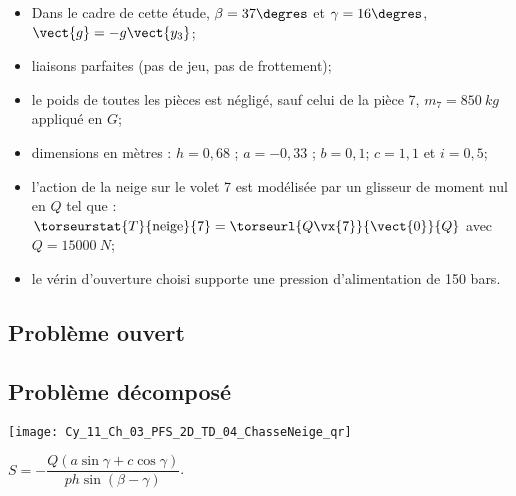 \begin{itemize}
\item Dans le cadre de cette étude, $\beta = 37\degres$ et $\gamma = 16\degres$, $\vect{g}=-g\vect{y_3}$;
\item liaisons parfaites (pas de jeu, pas de frottement);
\item le poids de toutes les pièces est négligé, sauf celui de la pièce 7, $m_7=\SI{850}{kg}$ appliqué en $G$;
\item dimensions en mètres :  $h=0,68$ ; $a=-0,33$ ; $b=0,1$; $c=1,1$ et $i=0,5$;
\item l’action de la neige sur le volet 7 est modélisée par un glisseur de moment nul en $Q$ tel que :
$\torseurstat{T}{\text{neige}}{7} =  \torseurl{Q\vx{7}}{\vect{0}}{Q}$ avec $Q = \SI{15000}{N}$;
\item le vérin d’ouverture choisi supporte une pression d'alimentation de 150 bars.
\end{itemize}

\fi
\subsection*{Problème ouvert}


\subsection*{Problème décomposé}







\ifprof
\else
\begin{marginfigure}
\centering
\texttt{[image: Cy\_11\_Ch\_03\_PFS\_2D\_TD\_04\_ChasseNeige\_qr]}
\end{marginfigure}
\fi


\ifprof
\else
\begin{marginfigure}
\begin{solution}
$S= - \dfrac{Q\left( a\sin \gamma+c\cos\gamma \right)  }{p h \sin\left(\beta - \gamma\right)}$.
\end{solution}
\end{marginfigure}
\fi


